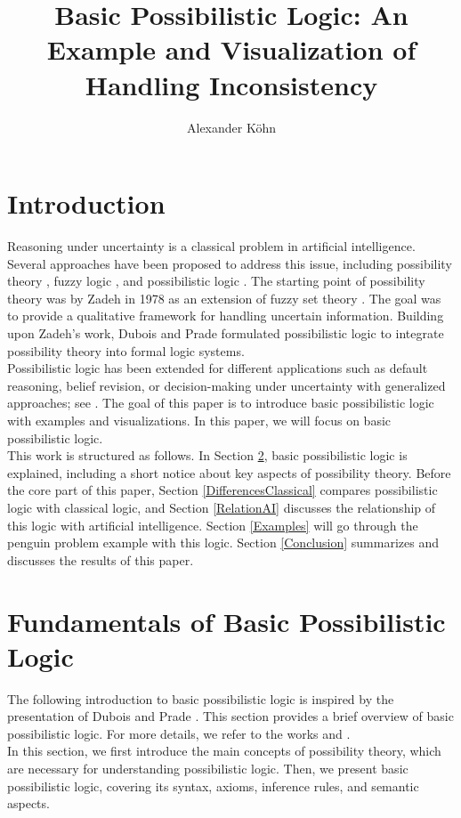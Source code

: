 \documentclass[seminar,english,m]{AIGpaper}
\author{Alexander Köhn}
\title{Basic Possibilistic Logic: An Example and Visualization of Handling Inconsistency}
\begin{document}
\maketitle %
\section{Introduction}
Reasoning under uncertainty is a classical problem in artificial intelligence. Several approaches have been proposed to address this issue, including possibility theory \cite{halpern1990}, fuzzy logic \cite{zadeh1965}, and possibilistic logic \cite{dubois1991}. The starting point of possibility theory was by Zadeh in 1978 \cite{zadeh1978} as an extension of fuzzy set theory \cite{zadeh1965}. The goal was to provide a qualitative framework for handling uncertain information. Building upon Zadeh’s work, Dubois and Prade formulated possibilistic logic \cite{dubois1991} to integrate possibility theory into formal logic systems. \\
Possibilistic logic has been extended for different applications such as default reasoning, belief revision, or decision-making under uncertainty with generalized approaches; see \cite{dubois2017generalized}. The goal of this paper is to introduce basic possibilistic logic with examples and visualizations. In this paper, we will focus on basic possibilistic logic. \\
This work is structured as follows. In Section \ref{Fundamentals}, basic possibilistic logic is explained, including a short notice about key aspects of possibility theory. Before the core part of this paper, Section \ref{DifferencesClassical} compares possibilistic logic with classical logic, and Section \ref{RelationAI} discusses the relationship of this logic with artificial intelligence. Section \ref{Examples} will go through the penguin problem example with this logic. Section \ref{Conclusion} summarizes and discusses the results of this paper.
\section{Fundamentals of Basic Possibilistic Logic} \label{Fundamentals}
The following introduction to basic possibilistic logic is inspired by the presentation of Dubois and Prade \cite{dubois2014possibilistic}. This section provides a brief overview of basic possibilistic logic. For more details, we refer to the works \cite{dubois2014possibilistic} and \cite{dubois1991}. \\
In this section, we first introduce the main concepts of possibility theory, which are necessary for understanding possibilistic logic. Then, we present basic possibilistic logic, covering its syntax, axioms, inference rules, and semantic aspects.
\end{document}

